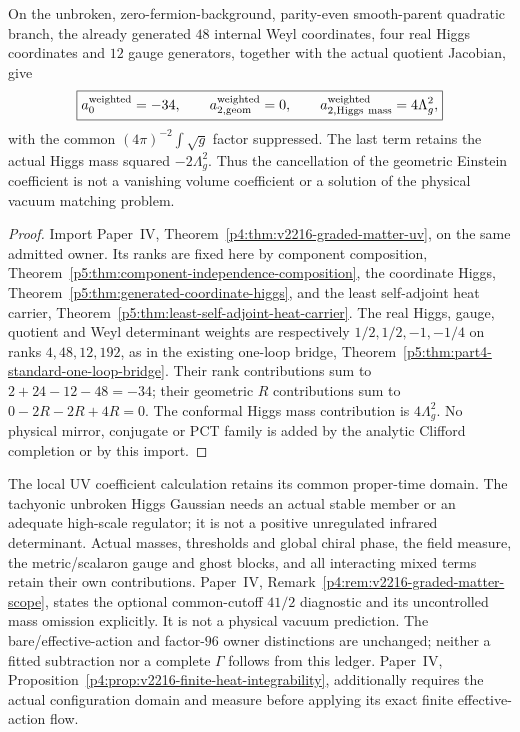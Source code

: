\documentclass[12pt,a4paper]{article}
\begin{document}
\begin{corollary}
\label{p5:cor:v2216-matter-vacuum-ledger}
On the unbroken, zero-fermion-background, parity-even smooth-parent
quadratic branch, the already generated $48$ internal Weyl coordinates,
four real Higgs coordinates and $12$ gauge generators, together with the
actual quotient Jacobian, give
\[
 \boxed{a_0^{\rm weighted}=-34,\qquad
 a_{2,\rm geom}^{\rm weighted}=0,\qquad
 a_{2,\rm Higgs\ mass}^{\rm weighted}=4\Lambda_g^2,}
\]
with the common $(4\pi)^{-2}\int\sqrt g$ factor suppressed.
The last term retains the actual Higgs mass squared $-2\Lambda_g^2$.
Thus the cancellation of the geometric Einstein coefficient is not a
vanishing volume coefficient or a solution of the physical vacuum
matching problem.
\end{corollary}
\begin{proof}
Import Paper~IV, Theorem~\ref{p4:thm:v2216-graded-matter-uv}, on the
same admitted owner. Its ranks are fixed here by component composition,
Theorem~\ref{p5:thm:component-independence-composition}, the coordinate
Higgs, Theorem~\ref{p5:thm:generated-coordinate-higgs}, and the least
self-adjoint heat carrier,
Theorem~\ref{p5:thm:least-self-adjoint-heat-carrier}. The real Higgs,
gauge, quotient and Weyl determinant weights are respectively
$1/2,1/2,-1,-1/4$ on ranks $4,48,12,192$, as in the existing
one-loop bridge, Theorem~\ref{p5:thm:part4-standard-one-loop-bridge}.
Their rank contributions sum to $2+24-12-48=-34$; their geometric
$R$ contributions sum to $0-2R-2R+4R=0$.
The conformal Higgs mass contribution is $4\Lambda_g^2$.
No physical mirror, conjugate or PCT family is added by the analytic
Clifford completion or by this import.
\end{proof}

\begin{remark}
\label{p5:rem:v2216-matter-vacuum-frontier}
The local UV coefficient calculation retains its common proper-time
domain. The tachyonic unbroken Higgs Gaussian needs an actual stable
member or an adequate high-scale regulator; it is not a positive
unregulated infrared determinant. Actual masses, thresholds and global
chiral phase, the field measure, the metric/scalaron gauge and ghost
blocks, and all interacting mixed terms retain their own contributions.
Paper~IV, Remark~\ref{p4:rem:v2216-graded-matter-scope}, states the
optional common-cutoff $41/2$ diagnostic and its uncontrolled mass
omission explicitly. It is not a physical vacuum prediction. The
bare/effective-action and factor-$96$ owner distinctions are unchanged;
neither a fitted subtraction nor a complete $\Gamma$ follows from this
ledger. Paper~IV,
Proposition~\ref{p4:prop:v2216-finite-heat-integrability}, additionally
requires the actual configuration domain and measure before applying its
exact finite effective-action flow.
\end{remark}
\end{document}

